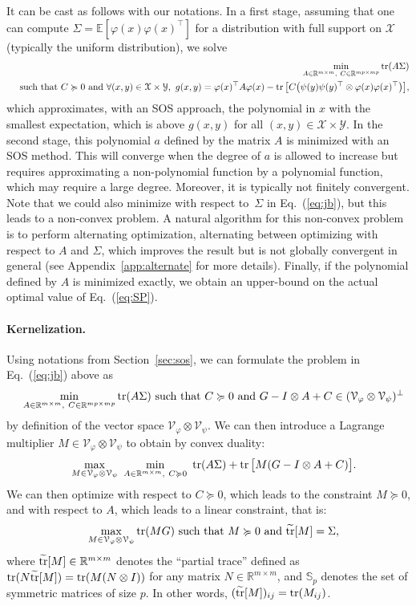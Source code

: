 \documentclass[11pt]{article}
\newcommand{\BEAS}{\begin{eqnarray*}}
\newcommand{\EEAS}{\end{eqnarray*}}
\newcommand{\BEA}{\begin{eqnarray}}
\newcommand{\EEA}{\end{eqnarray}}
\newcommand{\tr}{\mathop{ \rm tr}}
\newcommand{\idm}{I}
\newcommand{\rb}{\mathbb{R}}
\newcommand{\mysec}[1]{Section~\ref{sec:#1}}
\newcommand{\eq}[1]{Eq.~(\ref{eq:#1})}
\def \E{{\mathbb E}}
\def \X{{\mathcal X}}
\def \V{{\mathcal V}}
\def \Y{{\mathcal Y}}
\begin{document}
 It can be cast as follows with our notations. In a first stage, assuming that one can compute $\Sigma = \E [ \varphi(x) \varphi(x)^\top]$ for a distribution with full support on $\X$  (typically the uniform distribution), we solve
 \BEA
\label{eq:jb} 
\label{eq:sosex} & & \min_{ A \in \rb^{m \times m}, \ C \in \rb^{mp \times mp} }\tr (A \Sigma) \\
 \notag & & \mbox{ such that }
 C \succcurlyeq 0 \mbox{ and } \forall (x,y) \in \X \times \Y, \ g(x,y) = \varphi(x)^\top A \varphi(x) -  \tr \big[ C  \big( \psi(y)\psi(y)^\top  \otimes \varphi(x)\varphi(x)^\top  \big) \big],
 \EEA
 which approximates, with an SOS approach, the polynomial in $x$ with the smallest expectation, which is above $g(x,y)$ for all $(x,y) \in \X \times \Y$. In the second stage, this polynomial  $a$ defined by the matrix $A$ is minimized with an SOS method. This will converge when the degree of $a$ is allowed to increase but requires approximating a non-polynomial function by a polynomial function, which may require a large degree. Moreover, it is typically not finitely convergent.
 Note that we could also minimize with respect to~$\Sigma$ in \eq{jb}, but this leads to a non-convex problem. A natural algorithm for this non-convex problem is to perform alternating optimization, alternating between optimizing with respect to $A$ and $\Sigma$, which improves the result but is not globally convergent in general (see Appendix~\ref{app:alternate} for more details). Finally, if the polynomial defined by $A$ is minimized exactly, we obtain an upper-bound on the actual optimal value of \eq{SP}.

\paragraph{Kernelization.} Using notations from \mysec{sos},
 we can formulate the problem in \eq{jb} above as
  \BEAS
&& \min_{ A \in \rb^{m \times m}, \ C \in \rb^{mp \times mp} }\tr (A \Sigma) \mbox{ such that }
 C \succcurlyeq 0 \mbox{ and } G   - \idm \otimes A    +  C   \in (\V_\varphi \otimes \V_\psi)^\perp
 \EEAS
 by definition of the vector space $\V_\varphi \otimes \V_\psi$. We can then introduce a Lagrange multiplier $M \in \V_\varphi \otimes \V_\psi$ to obtain by convex duality:
 \BEAS
 &  & 
 \max_{M \in \V_\varphi \otimes \V_\psi} \ 
 \min_{ A \in \rb^{m \times m}, \ C \succcurlyeq 0 } \ \tr (A \Sigma)  + \tr \big[ M ( G   - \idm \otimes A     +  C  ) \big].
\EEAS
We can then optimize with respect to $C \succcurlyeq 0$, which leads to the constraint $M \succcurlyeq 0$, and with respect to $A$, which leads to a linear constraint, that is:
\BEAS
 &  & 
 \max_{M \in \V_\varphi \otimes \V_\psi} \tr ( M  G) \mbox{ such that } M \succcurlyeq 0 \mbox{ and } \widetilde{\tr}[M] =   \Sigma,
 \EEAS
 where  $\widetilde{\tr} [M] \in \rb^{m \times m} $ denotes the ``partial trace'' defined as $\tr( N \widetilde{\tr} [M]  ) = \tr( M(N \otimes \idm))$ for any matrix $N \in \rb^{ m \times m}$, and $\mathbb{S}_p$ denotes the set of symmetric matrices of size $p$.  In other words, $(\widetilde{\tr} [M])_{ij} = \tr( M_{ij})$.
\end{document}
